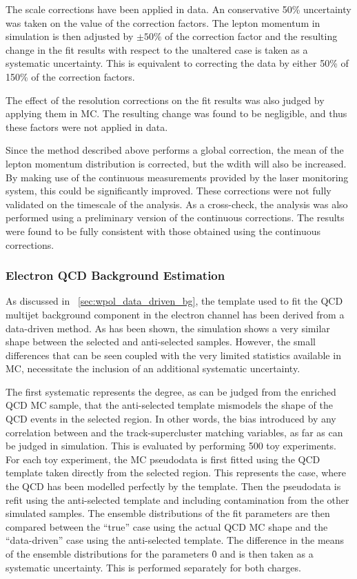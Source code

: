 The scale corrections have been applied in data. An conservative 50\%
uncertainty was taken on the value of the correction factors. The lepton
momentum in simulation is then adjusted by $\pm 50\%$ of the correction factor
and the resulting change in the fit results with respect to the unaltered case
is taken as a systematic uncertainty. This is equivalent to correcting the data
by either 50\% of 150\% of the correction factors.

The effect of the resolution corrections on the fit results was also judged by
applying them in \ac{MC}. The resulting change was found to be negligible,
and thus these factors were not applied in data.

Since the method described above performs a global correction, the mean of the
lepton momentum distribution is corrected, but the wdith will also be
increased. By making use of the continuous measurements provided by the laser
monitoring system, this could be significantly improved. These corrections were
not fully validated on the timescale of the analysis. As a cross-check, the
analysis was also performed using a preliminary version of the continuous
corrections. The results were found to be fully consistent with those obtained
using the continuous corrections.

\subsubsection{Electron \ac{QCD} Background Estimation}
\label{sec:wpol_syst_ele_bgest}
As discussed in \sec~\ref{sec:wpol_data_driven_bg}, the template used to fit
the \ac{QCD} multijet background component in the electron channel has been
derived from a data-driven method. As has been shown, the simulation shows a
very similar \LP shape between the selected and anti-selected samples. However,
the small differences that can be seen coupled with the very limited statistics
available in \ac{MC}, necessitate the inclusion of an additional systematic
uncertainty.

The first systematic represents the degree, as can be judged from the enriched
\ac{QCD} \ac{MC} sample, that the anti-selected template mismodels the \LP shape
of the \ac{QCD} events in the selected region. In other words, the bias
introduced by any correlation between \LP and the track-supercluster matching
variables, as far as can be judged in simulation. This is evaluated by
performing 500 toy experiments. For each toy experiment, the \ac{MC} pseudodata
is first fitted using the \ac{QCD} template taken directly from the selected
region. This represents the case, where the \ac{QCD} has been modelled perfectly
by the template. Then the pseudodata is refit using the anti-selected template
and including contamination from the other simulated samples. The ensemble
distributions of the fit parameters are then compared between the ``true'' case
using the actual \ac{QCD} \ac{MC} shape and the ``data-driven'' case using the
anti-selected template. The difference in the means of the ensemble
distributions for the parameters \f0 and \fLmfR is then taken as a systematic
uncertainty. This is performed separately for both charges.

